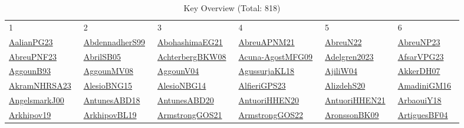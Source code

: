 \begin{longtable}{*{6}{l}}
\rowcolor{white}\caption{Key Overview (Total: 818)}\\ \toprule
\rowcolor{white}1 & 2 & 3 & 4 & 5 & 6\\ \midrule
\endhead
\bottomrule
\endfoot
\href{../works/AalianPG23.pdf}{AalianPG23}~\cite{AalianPG23} & \href{../works/AbdennadherS99.pdf}{AbdennadherS99}~\cite{AbdennadherS99} & \href{../works/AbohashimaEG21.pdf}{AbohashimaEG21}~\cite{AbohashimaEG21} & \href{../works/AbreuAPNM21.pdf}{AbreuAPNM21}~\cite{AbreuAPNM21} & \href{../works/AbreuN22.pdf}{AbreuN22}~\cite{AbreuN22} & \href{../works/AbreuNP23.pdf}{AbreuNP23}~\cite{AbreuNP23}\\ 
\href{../works/AbreuPNF23.pdf}{AbreuPNF23}~\cite{AbreuPNF23} & \href{../works/AbrilSB05.pdf}{AbrilSB05}~\cite{AbrilSB05} & \href{../works/AchterbergBKW08.pdf}{AchterbergBKW08}~\cite{AchterbergBKW08} & \href{../works/Acuna-AgostMFG09.pdf}{Acuna-AgostMFG09}~\cite{Acuna-AgostMFG09} & \href{../works/Adelgren2023.pdf}{Adelgren2023}~\cite{Adelgren2023} & \href{../works/AfsarVPG23.pdf}{AfsarVPG23}~\cite{AfsarVPG23}\\ 
\href{../works/AggounB93.pdf}{AggounB93}~\cite{AggounB93} & \href{../}{AggounMV08}~\cite{AggounMV08} & \href{../}{AggounV04}~\cite{AggounV04} & \href{../works/AgussurjaKL18.pdf}{AgussurjaKL18}~\cite{AgussurjaKL18} & \href{../}{AjiliW04}~\cite{AjiliW04} & \href{../works/AkkerDH07.pdf}{AkkerDH07}~\cite{AkkerDH07}\\ 
\href{../works/AkramNHRSA23.pdf}{AkramNHRSA23}~\cite{AkramNHRSA23} & \href{../works/AlesioBNG15.pdf}{AlesioBNG15}~\cite{AlesioBNG15} & \href{../works/AlesioNBG14.pdf}{AlesioNBG14}~\cite{AlesioNBG14} & \href{../works/AlfieriGPS23.pdf}{AlfieriGPS23}~\cite{AlfieriGPS23} & \href{../}{AlizdehS20}~\cite{AlizdehS20} & \href{../works/AmadiniGM16.pdf}{AmadiniGM16}~\cite{AmadiniGM16}\\ 
\href{../works/AngelsmarkJ00.pdf}{AngelsmarkJ00}~\cite{AngelsmarkJ00} & \href{../works/AntunesABD18.pdf}{AntunesABD18}~\cite{AntunesABD18} & \href{../works/AntunesABD20.pdf}{AntunesABD20}~\cite{AntunesABD20} & \href{../works/AntuoriHHEN20.pdf}{AntuoriHHEN20}~\cite{AntuoriHHEN20} & \href{../works/AntuoriHHEN21.pdf}{AntuoriHHEN21}~\cite{AntuoriHHEN21} & \href{../works/ArbaouiY18.pdf}{ArbaouiY18}~\cite{ArbaouiY18}\\ 
\href{../}{Arkhipov19}~\cite{Arkhipov19} & \href{../works/ArkhipovBL19.pdf}{ArkhipovBL19}~\cite{ArkhipovBL19} & \href{../works/ArmstrongGOS21.pdf}{ArmstrongGOS21}~\cite{ArmstrongGOS21} & \href{../works/ArmstrongGOS22.pdf}{ArmstrongGOS22}~\cite{ArmstrongGOS22} & \href{../works/AronssonBK09.pdf}{AronssonBK09}~\cite{AronssonBK09} & \href{../works/ArtiguesBF04.pdf}{ArtiguesBF04}~\cite{ArtiguesBF04}\\ 

\end{longtable}

